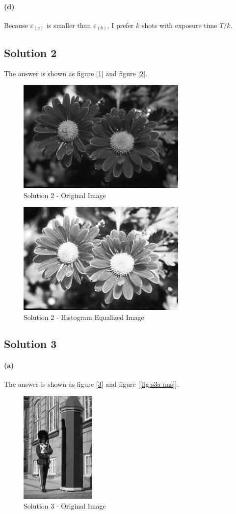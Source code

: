 \documentclass{article}
\newcommand{\solution}[1]{\clearpage \subsection*{Solution #1}}
\newcommand{\spart}[1]{\paragraph{(#1)}}
\begin{document}
\spart{d}
Because $\varepsilon_{(c)}$ is smaller than $\varepsilon_{(b)}$, I prefer $k$ shots with exposure time $T/k$.
\solution{2} 
The answer is shown as figure [\ref{fig:s2-ori}] and figure [\ref{fig:s2-ans}].
\begin{figure}[!h]
  \centering
  \includegraphics[height=15em]{"code/inputs/p2_inp.jpg"}
  \caption{Solution 2 - Original Image}
  \label{fig:s2-ori}
\end{figure}
\begin{figure}[!h]
  \centering
  \includegraphics[height=15em]{"code/outputs/prob2.jpg"}
  \caption{Solution 2 - Histogram Equalized Image}
  \label{fig:s2-ans}
\end{figure}
\solution{3}
\spart{a}
The answer is shown as figure [\ref{fig:s3a-ori}] and figure [\ref{fig:s3a-ans}].
\begin{figure}[!h]
  \centering
  \includegraphics[height=15em]{"code/inputs/p3_inp.jpg"}
  \caption{Solution 3 - Original Image}
  \label{fig:s3a-ori}
\end{figure}
\end{document}
